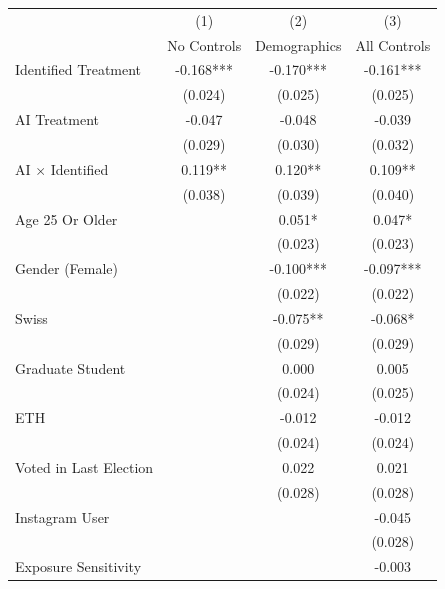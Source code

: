 \begin{tabular*}{\hsize}{@{\hskip\tabcolsep\extracolsep\fill}l*{3}{c}}
\toprule
                &\multicolumn{1}{c}{(1)}&\multicolumn{1}{c}{(2)}&\multicolumn{1}{c}{(3)}\\
                &\multicolumn{1}{c}{No Controls}&\multicolumn{1}{c}{Demographics}&\multicolumn{1}{c}{All Controls}\\
\midrule
Identified Treatment&   -0.168***&   -0.170***&   -0.161***\\
                &  (0.024)   &  (0.025)   &  (0.025)   \\
\addlinespace
AI Treatment    &   -0.047   &   -0.048   &   -0.039   \\
                &  (0.029)   &  (0.030)   &  (0.032)   \\
\addlinespace
AI $\times$ Identified&    0.119** &    0.120** &    0.109** \\
                &  (0.038)   &  (0.039)   &  (0.040)   \\
\addlinespace
Age 25 Or Older &            &    0.051*  &    0.047*  \\
                &            &  (0.023)   &  (0.023)   \\
\addlinespace
Gender (Female) &            &   -0.100***&   -0.097***\\
                &            &  (0.022)   &  (0.022)   \\
\addlinespace
Swiss           &            &   -0.075** &   -0.068*  \\
                &            &  (0.029)   &  (0.029)   \\
\addlinespace
Graduate Student&            &    0.000   &    0.005   \\
                &            &  (0.024)   &  (0.025)   \\
\addlinespace
ETH             &            &   -0.012   &   -0.012   \\
                &            &  (0.024)   &  (0.024)   \\
\addlinespace
Voted in Last Election&            &    0.022   &    0.021   \\
                &            &  (0.028)   &  (0.028)   \\
\addlinespace
Instagram User  &            &            &   -0.045   \\
                &            &            &  (0.028)   \\
\addlinespace
Exposure Sensitivity&            &            &   -0.003   \\

\end{tabular*}
